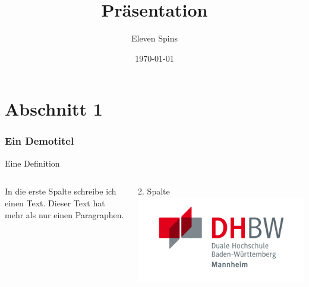 \documentclass[10pt]{beamer}
\title{Präsentation}
\author{Eleven Spins}
\date{\today}
\begin{document}
\maketitle
\frame{\tableofcontents[currentsection]}

\section{Abschnitt 1}
\begin{frame} %
  \frametitle{Ein Demotitel} %
  \begin{Definition} %
    Eine Definition
  \end{Definition}
\end{frame}
\begin{frame}
    \begin{columns}[c]
        In die erste Spalte schreibe ich einen Text.
        Dieser Text hat mehr als nur einen Paragraphen. 
        
        2. Spalte
         \includegraphics[width=\linewidth]{assets/DHBW_MA_Logo.jpg}
        \end{columns}
    
\end{frame}
\end{document}
